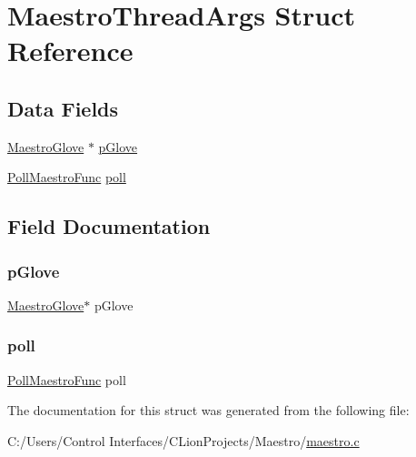 \hypertarget{struct_maestro_thread_args}{}\section{Maestro\+Thread\+Args Struct Reference}
\label{struct_maestro_thread_args}
\subsection*{Data Fields}
\begin{DoxyCompactItemize}
\item 
\hyperlink{struct_maestro_glove}{Maestro\+Glove} $\ast$ \hyperlink{struct_maestro_thread_args_ac14936a0d6d298e03cf589e125c0d607}{p\+Glove}
\item 
\hyperlink{maestro_8h_af5aa626ca28c2c60d6df17f73d397915}{Poll\+Maestro\+Func} \hyperlink{struct_maestro_thread_args_ada7689f851e14b7005478d6673683d8b}{poll}
\end{DoxyCompactItemize}


\subsection{Field Documentation}
\mbox{\label{struct_maestro_thread_args_ac14936a0d6d298e03cf589e125c0d607}} 
\subsubsection{\texorpdfstring{p\+Glove}{pGlove}}
{\footnotesize\ttfamily \hyperlink{struct_maestro_glove}{Maestro\+Glove}$\ast$ p\+Glove}

\mbox{\label{struct_maestro_thread_args_ada7689f851e14b7005478d6673683d8b}} 
\subsubsection{\texorpdfstring{poll}{poll}}
{\footnotesize\ttfamily \hyperlink{maestro_8h_af5aa626ca28c2c60d6df17f73d397915}{Poll\+Maestro\+Func} poll}



The documentation for this struct was generated from the following file\+:\begin{DoxyCompactItemize}
\item 
C\+:/\+Users/\+Control Interfaces/\+C\+Lion\+Projects/\+Maestro/\hyperlink{maestro_8c}{maestro.\+c}\end{DoxyCompactItemize}
